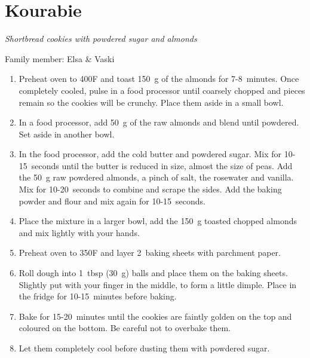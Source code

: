 \chapter{Kourabie}
\label{ch:kourabie}



\textit{Shortbread cookies with powdered sugar and almonds}

Family member: Elsa \& Vaski

\begin{enumerate}
    \item Preheat oven to 400\degree F and toast 150~g of the almonds for 7-8~minutes. Once completely cooled, pulse in a food processor until coarsely chopped and pieces remain so the cookies will be crunchy. Place them aside in a small bowl.
    \item In a food processor, add 50~g of the raw almonds and blend until powdered. Set aside in another bowl.
    \item In the food processor, add the cold butter and powdered sugar. Mix for 10-15~seconds until the butter is reduced in size, almost the size of peas. Add the 50~g raw powdered almonds, a pinch of salt, the rosewater and vanilla. Mix for 10-20~seconds to combine and scrape the sides. Add the baking powder and flour and mix again for 10-15~seconds.
    \item Place the mixture in a larger bowl, add the 150~g toasted  chopped almonds and mix lightly with your hands.
    \item Preheat oven to 350\degree F and layer 2~baking sheets with parchment paper.
    \item Roll dough into 1~tbsp (30~g) balls and place them on the baking sheets. Slightly put with your finger in the middle, to form a little dimple. Place in the fridge for 10-15~minutes before baking.
    \item Bake for 15-20~minutes until the cookies are faintly golden on the top and coloured on the bottom. Be careful not to overbake them.
    \item Let them completely cool before dusting them with powdered sugar.
\end{enumerate}
